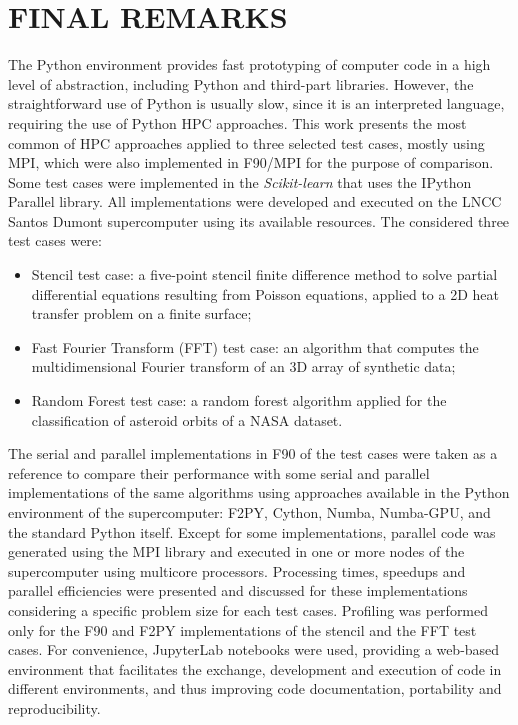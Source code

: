 \chapter{FINAL REMARKS}
\label{ch_final}

The Python environment provides fast prototyping of computer code in a high level of abstraction, including Python and third-part libraries. However, the straightforward use of Python is usually slow, since it is an interpreted language, requiring the use of Python HPC approaches. This work presents the most common of HPC approaches applied to three selected test cases, mostly using MPI, which were also implemented in F90/MPI for the purpose of comparison. Some test cases were implemented in the \textit {Scikit-learn} that uses the IPython Parallel library. All implementations were developed and executed on the LNCC Santos Dumont supercomputer using its available resources. The considered three test cases were:

\begin{itemize}

\item Stencil test case: a five-point stencil finite difference method to solve partial differential equations resulting from Poisson equations, applied to a 2D heat transfer problem on a finite surface;

\item Fast Fourier Transform (FFT) test case: an algorithm that computes the multidimensional Fourier transform of an 3D array of synthetic data; 

\item Random Forest test case: a random forest algorithm applied for the classification of asteroid orbits of a NASA dataset.

\end{itemize}

The serial and parallel implementations in F90 of the test cases were taken as a reference to compare their performance with some serial and parallel implementations of the same algorithms using approaches available in the Python environment of the supercomputer: F2PY, Cython, Numba, Numba-GPU, and the standard Python itself. Except for some implementations, parallel code was generated using the MPI library and executed in one or more nodes of the supercomputer using multicore processors. Processing times, speedups and parallel efficiencies were presented and discussed for these implementations considering a specific problem size for each test cases. Profiling was performed only for the F90 and F2PY implementations of the stencil and the FFT test cases. For convenience, JupyterLab notebooks were used, providing a web-based environment that facilitates the exchange, development and execution of code in different environments, and thus improving code documentation, portability and reproducibility.  

